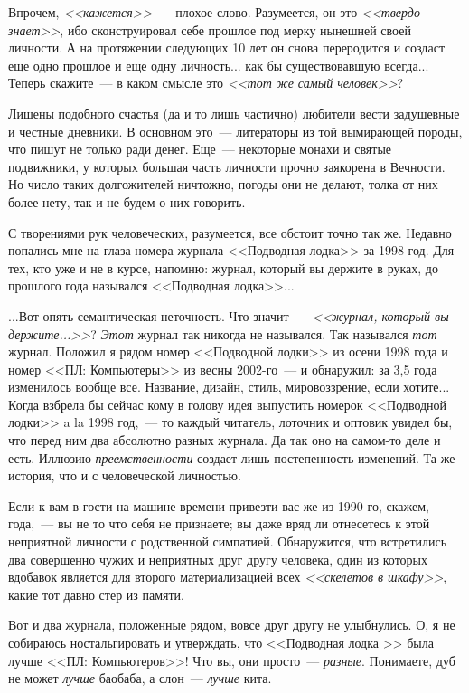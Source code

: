 \documentclass{scrbook}
\newcommand{\flqq}{<<}
\newcommand{\frqq}{>>}
\newcommand{\mdash}{~--- }
\newcommand{\commamdash}{~--- } %
\begin{document}
Впрочем, \emph{{\flqq}кажется{\frqq}}{\mdash}плохое слово. Разумеется, он это \emph{{\flqq}твердо знает{\frqq}}, ибо сконструировал себе прошлое под мерку нынешней своей личности. А на протяжении следующих 10 лет он снова переродится и создаст еще одно прошлое и еще одну личность... как бы существовавшую всегда... Теперь скажите{\mdash}в каком смысле это \emph{{\flqq}тот же самый человек{\frqq}}?

Лишены подобного счастья (да и то лишь частично) любители вести задушевные и честные дневники. В основном это{\mdash}литераторы из той вымирающей породы, что пишут не только ради денег. Еще{\mdash}некоторые монахи и святые подвижники, у которых большая часть личности прочно заякорена в Вечности. Но число таких долгожителей ничтожно, погоды они не делают, толка от них более нету, так и не будем о них говорить.

С творениями рук человеческих, разумеется, все обстоит точно так же. Недавно попались мне на глаза номера журнала {\flqq}Подводная лодка{\frqq} за 1998 год. Для тех, кто уже и не в курсе, напомню: журнал, который вы держите в руках, до прошлого года назывался {\flqq}Подводная лодка{\frqq}...

...Вот опять семантическая неточность. Что значит{\mdash}\emph{{\flqq}журнал, который вы держите...{\frqq}}? \emph{Этот} журнал так никогда не назывался. Так назывался \emph{тот} журнал. Положил я рядом номер {\flqq}Подводной лодки{\frqq} из осени 1998 года и номер {\flqq}ПЛ: Компьютеры{\frqq} из весны 2002-го{\mdash}и обнаружил: за 3,5 года изменилось вообще все. Название, дизайн, стиль, мировоззрение, если хотите... Когда взбрела бы сейчас кому в голову идея выпустить номерок {\flqq}Подводной лодки{\frqq} a la 1998 год,{\commamdash}то каждый читатель, лоточник и оптовик увидел бы, что перед ним два абсолютно разных журнала. Да так оно на самом-то деле и есть. Иллюзию \emph{преемственности} создает лишь постепенность изменений. Та же история, что и с человеческой личностью.

Если к вам в гости на машине времени привезти вас же из 1990-го, скажем, года,{\commamdash}вы не то что себя не признаете; вы даже вряд ли отнесетесь к этой неприятной личности с родственной симпатией. Обнаружится, что встретились два совершенно чужих и неприятных друг другу человека, один из которых вдобавок является для второго материализацией всех \emph{{\flqq}скелетов в шкафу{\frqq}}, какие тот давно стер из памяти.

Вот и два журнала, положенные рядом, вовсе друг другу не улыбнулись. О, я не собираюсь ностальгировать и утверждать, что {\flqq}Подводная лодка {\frqq} была лучше {\flqq}ПЛ: Компьютеров{\frqq}! Что вы, они просто{\mdash}\emph{разные}. Понимаете, дуб не может \emph{лучше} баобаба, а слон{\mdash}\emph{лучше} кита.
\end{document}
